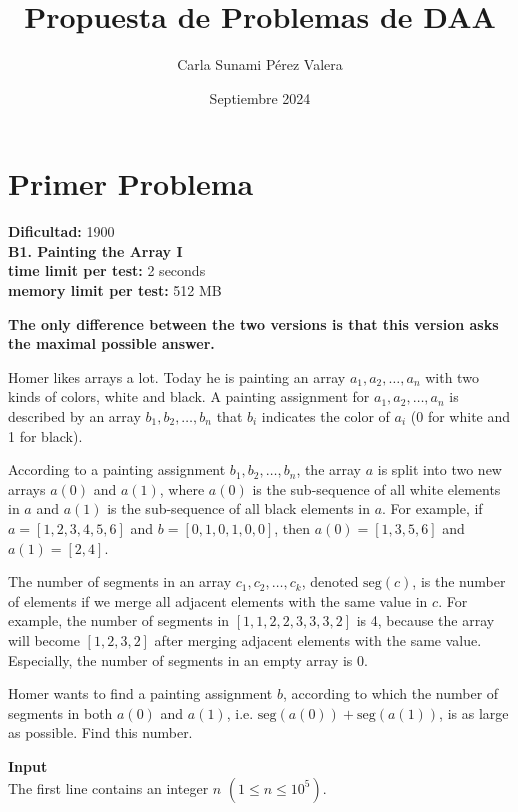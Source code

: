 \documentclass{article}
\title{Propuesta de Problemas de DAA}
\author{Carla Sunami Pérez Valera}
\date{Septiembre 2024}
\begin{document}
\maketitle

\section{Primer Problema}

\begin{center}
    \large \textbf{Dificultad:} 1900\\
    \LARGE \textbf{B1. Painting the Array I} \\[0.5em] 
    \large \textbf{time limit per test:} 2 seconds\\
    \large \textbf{memory limit per test:} 512 MB
\end{center}

\textbf{The only difference between the two versions is that this version asks the maximal possible answer.}

Homer likes arrays a lot. Today he is painting an array \( a_1, a_2, \ldots, a_n \) with two kinds of colors, white and black. A painting assignment for \( a_1, a_2, \ldots, a_n \) is described by an array \( b_1, b_2, \ldots, b_n \) that \( b_i \) indicates the color of \( a_i \) (0 for white and 1 for black).

According to a painting assignment \( b_1, b_2, \ldots, b_n \), the array \( a \) is split into two new arrays \( a(0) \) and \( a(1) \), where \( a(0) \) is the sub-sequence of all white elements in \( a \) and \( a(1) \) is the sub-sequence of all black elements in \( a \). For example, if \( a=[1,2,3,4,5,6] \) and \( b=[0,1,0,1,0,0] \), then \( a(0)=[1,3,5,6] \) and \( a(1)=[2,4] \).

The number of segments in an array \( c_1, c_2, \ldots, c_k \), denoted \( \text{seg}(c) \), is the number of elements if we merge all adjacent elements with the same value in \( c \). For example, the number of segments in \([1,1,2,2,3,3,3,2]\) is 4, because the array will become \([1,2,3,2]\) after merging adjacent elements with the same value. Especially, the number of segments in an empty array is 0.

Homer wants to find a painting assignment \( b \), according to which the number of segments in both \( a(0) \) and \( a(1) \), i.e. \( \text{seg}(a(0))+\text{seg}(a(1)) \), is as large as possible. Find this number.

\large \textbf{Input}\\
The first line contains an integer \( n \) \( (1 \leq n \leq 10^5) \).
\end{document}
